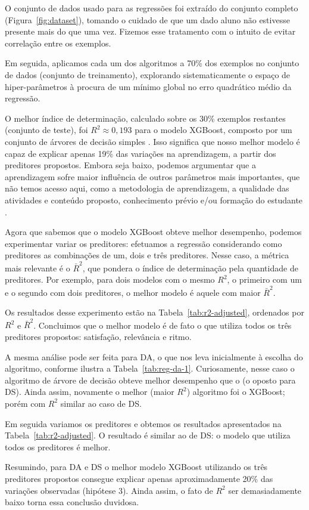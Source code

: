 O conjunto de dados usado para as regressões foi extraído do conjunto completo (Figura~\ref{fig:dataset}), tomando o cuidado de que um dado aluno não estivesse presente mais do que uma vez.
Fizemos esse tratamento com o intuito de evitar correlação entre os exemplos.

Em seguida, aplicamos cada um dos algoritmos a 70\% dos exemplos no conjunto de dados (conjunto de treinamento), explorando sistematicamente o espaço de hiper-parâmetros à procura de um mínimo global no erro quadrático médio da regressão.

O melhor índice de determinação, calculado sobre os 30\% exemplos restantes (conjunto de teste), foi $R^2 \approx 0,193$ para o modelo XGBoost, composto por um conjunto de árvores de decisão simples \cite{Friedman2001}.
Isso significa que nosso melhor modelo é capaz de explicar apenas 19\% das variações na aprendizagem, a partir dos preditores propostos.
Embora seja baixo, podemos argumentar  que a aprendizagem sofre maior influência de outros parâmetros mais importantes, que não temos acesso aqui, como a metodologia de aprendizagem, a qualidade das atividades e conteúdo proposto, conhecimento prévio e/ou formação do estudante \etc.

Agora que sabemos que o modelo XGBoost obteve melhor desempenho, podemos experimentar variar os preditores: efetuamos a regressão considerando como preditores as combinações de um, dois e três preditores.
Nesse caso, a métrica mais relevante é o $\bar R^2$, que pondera o índice de determinação pela quantidade de preditores.
Por exemplo, para dois modelos com o mesmo $R^2$, o primeiro com um e o segundo com dois preditores, o melhor modelo é aquele com maior $\bar R^2$.

Os resultados desse experimento estão na Tabela~\ref{tab:r2-adjusted}, ordenados por $R^2$ e $\bar R^2$.
Concluimos que o melhor modelo é de fato o que utiliza todos os três preditores propostos: satisfação, relevância e ritmo.



A mesma análise pode ser feita para DA, o que nos leva inicialmente à escolha do algoritmo, conforme ilustra a Tabela~\ref{tab:reg-da-1}.
Curiosamente, nesse caso o algoritmo de árvore de decisão obteve melhor desempenho que o  (o oposto para DS).
Ainda assim, novamente o melhor (maior $R^2$) algoritmo foi o XGBoost; porém com $R^2$ similar ao caso de DS.

Em seguida variamos os preditores e obtemos os resultados apresentados na Tabela~\ref{tab:r2-adjusted}.
O resultado é similar ao de DS: o modelo que utiliza todos os preditores é melhor.



Resumindo, para DA e DS o melhor modelo XGBoost utilizando os três preditores propostos consegue explicar apenas aproximadamente 20\% das variações observadas (hipótese 3).
Ainda assim, o fato de $R^2$ ser demasiadamente baixo torna essa conclusão duvidosa.

